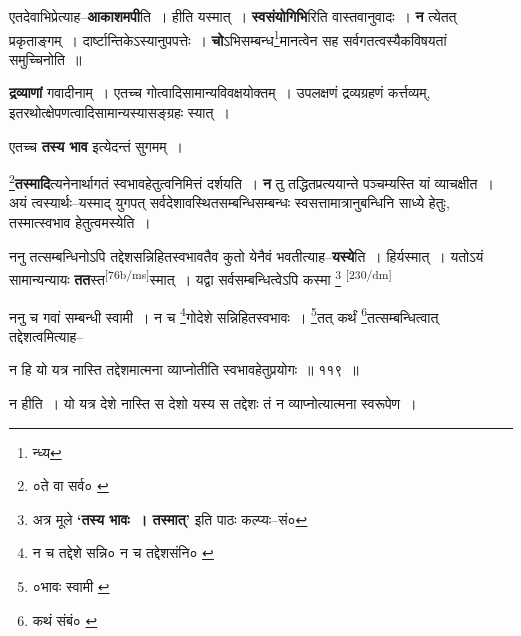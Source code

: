 \documentclass[article,12pt,a4paper]{memoir}
\begin{document}
	  \pstart एतदेवाभिप्रेत्याह--\textbf{आकाशमपी}ति । हीति यस्मात् । \textbf{स्वसंयोगिभि}रिति वास्तवानुवादः । \textbf{न} त्येतत् प्रकृताङ्गम् । दार्ष्टान्तिकेऽस्यानुपपत्तेः । \textbf{चो}ऽभिसम्बन्ध\footnote{न्ध्य}मानत्वेन सह सर्वगतत्वस्यैकविषयतां समुच्चिनोति ॥
	\pend
      

	  \pstart \textbf{द्रव्याणां} गवादीनाम् । एतच्च गोत्वादिसामान्यविवक्षयोक्तम् । उपलक्षणं द्रव्यग्रहणं कर्त्तव्यम्, इतरथोत्क्षेपणत्वादिसामान्यस्यासङ्ग्रहः स्यात् ।
	\pend
      

	  \pstart एतच्च \textbf{तस्य भाव} इत्येदन्तं सुगमम् ।
	\pend
      

	  \pstart \footnote{०ते वा सर्व० \cite{dp-msB}}\textbf{तस्मादि}त्यनेनार्थागतं स्वभावहेतुत्वनिमित्तं दर्शयति । \textbf{न} तु तद्धितप्रत्ययान्ते पञ्चम्यस्ति यां व्याचक्षीत । अयं त्वस्यार्थः--यस्माद् युगपत् सर्वदेशावस्थितसम्बन्धिसम्बन्धः स्वसत्तामात्रानुबन्धिनि साध्ये हेतुः, तस्मात्स्वभाव हेतुत्वमस्येति ।
	\pend
      

	  \pstart ननु तत्सम्बन्धिनोऽपि तद्देशसन्निहितस्वभावतैव कुतो येनैवं भवतीत्याह--\textbf{यस्ये}ति । हिर्यस्मात् । यतोऽयं सामान्यन्यायः \textbf{तत}स्त\leavevmode\textsuperscript{\rmlatinfont\tiny [76b/ms]}स्मात् । यद्वा सर्वसम्बन्धित्वेऽपि कस्मा  \footnote{अत्र मूले \textbf{‘तस्य भावः । तस्मात्’} इति पाठः कल्प्यः--सं०} \leavevmode\textsuperscript{\rmlatinfont\tiny [230/dm]} 
	  
	ननु च गवां सम्बन्धी स्वामी । न च \footnote{न च तद्देशे सन्नि० \cite{dp-msA} \cite{dp-msB} \cite{dp-edP} \cite{dp-edH} \cite{dp-edE} न च तद्देशसंनि० \cite{dp-edN}}गोदेशे सन्निहितस्वभावः । \footnote{०भावः स्वामी \cite{dp-msA} \cite{dp-msB} \cite{dp-edP} \cite{dp-edH} \cite{dp-edE} \cite{dp-edN}}तत् कर्थं \footnote{कथं संबं० \cite{dp-msA} \cite{dp-msB} \cite{dp-msC} \cite{dp-msD} \cite{dp-edP} \cite{dp-edH} \cite{dp-edN}}तत्सम्बन्धित्वात् तद्देशत्वमित्याह-- 
	  
	न हि यो यत्र नास्ति तद्देशमात्मना व्याप्नोतीति स्वभावहेतुप्रयोगः ॥ ११९ ॥ 
	  
	न हीति । यो यत्र देशे नास्ति स देशो यस्य स तद्देशः तं न व्याप्नोत्यात्मना स्वरूपेण । 
	  
\end{document}

